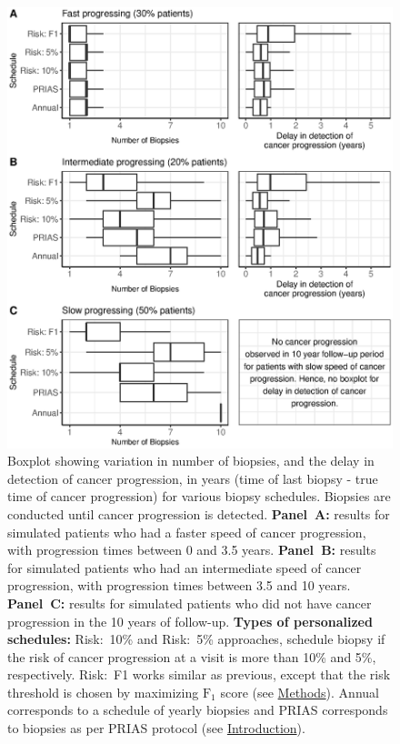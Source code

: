 \begin{figure}[!htb]
\captionsetup{justification=justified}
\centerline{\includegraphics[width=\columnwidth]{images/sim_res_combined.eps}}
\caption{Boxplot showing variation in number of biopsies, and the delay in detection of cancer progression, in years (time of last biopsy - true time of cancer progression) for various biopsy schedules. Biopsies are conducted until cancer progression is detected. \textbf{Panel~A:} results for simulated patients who had a faster speed of cancer progression, with progression times between 0 and 3.5 years. \textbf{Panel~B:} results for simulated patients who had an intermediate speed of cancer progression, with progression times between 3.5 and 10 years. \textbf{Panel~C:} results for simulated patients who did not have cancer progression in the 10 years of follow-up. \textbf{Types of personalized schedules:} Risk:~10\% and Risk:~5\% approaches, schedule biopsy if the risk of cancer progression at a visit is more than 10\% and 5\%, respectively. Risk:~F1 works similar as previous, except that the risk threshold is chosen by maximizing $\mbox{F}_1$ score (see \hyperref[sec:methods]{Methods}). Annual corresponds to a schedule of yearly biopsies and PRIAS corresponds to biopsies as per PRIAS protocol (see \hyperref[sec:introduction]{Introduction}).}
\label{fig:sim_res_combined}
\end{figure}

